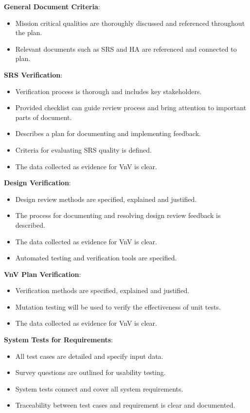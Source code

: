 \documentclass[12pt, titlepage]{article}
\begin{document}
\textbf{General Document Criteria}:
\begin{itemize}
  \item Mission critical qualities are thoroughly discussed and
    referenced throughout the plan.
  \item Relevant documents such as SRS and HA are referenced and
    connected to plan.
\end{itemize}
\textbf{SRS Verification}:
\begin{itemize}
  \item Verification process is thorough and includes key stakeholders.
  \item Provided checklist can guide review process and bring attention
    to important parts of document.
  \item Describes a plan for documenting and implementing feedback.
  \item Criteria for evaluating SRS quality is defined. 
  \item  The data collected as evidence for VnV is clear. 
\end{itemize}
\textbf{Design Verification}:
\begin{itemize}
  \item Design review methods are specified, explained and justified. 
  \item The process for documenting and resolving design review feedback is described. 
  \item  The data collected as evidence for VnV is clear. 
  \item Automated testing and verification tools are specified. 
\end{itemize}
\textbf{VnV Plan Verification}:
\begin{itemize}
  \item Verification methods are specified, explained and justified.
  \item Mutation testing will be used to verify the effectiveness of unit tests. 
  \item The data collected as evidence for VnV is clear. 
\end{itemize}
\textbf{System Tests for Requirements}:
\begin{itemize}
  \item All test cases are detailed and specify input data.
  \item Survey questions are outlined for usability testing.
  \item System tests connect and cover all system requirements.
  \item Traceability between test cases and requirement is clear and documented.
\end{itemize}
\end{document}
